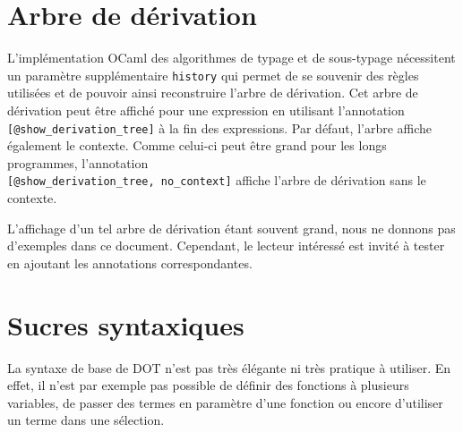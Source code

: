 %
%
%
%

\section{Arbre de dérivation}

L'implémentation OCaml des algorithmes de typage et de sous-typage nécessitent
un paramètre supplémentaire \verb|history| qui permet de se souvenir des règles
utilisées et de pouvoir ainsi reconstruire l'arbre de dérivation. Cet arbre de
dérivation peut être affiché pour une expression en utilisant l'annotation
\verb|[@show_derivation_tree]| à la fin des expressions. Par défaut, l'arbre
affiche également le contexte. Comme celui-ci peut être grand pour les
longs programmes, l'annotation \\ \verb|[@show_derivation_tree, no_context]|
affiche l'arbre de dérivation sans le contexte.

L'affichage d'un tel arbre de dérivation étant souvent grand, nous ne donnons pas
d'exemples dans ce document. Cependant, le lecteur intéressé est invité à tester
en ajoutant les annotations correspondantes. 

\section{Sucres syntaxiques}

La syntaxe de base de DOT n'est pas très élégante ni très pratique à utiliser.
En effet, il n'est par exemple pas possible de définir des fonctions à plusieurs
variables, de passer des termes en paramètre d'une fonction ou encore d'utiliser
un terme dans une sélection.

